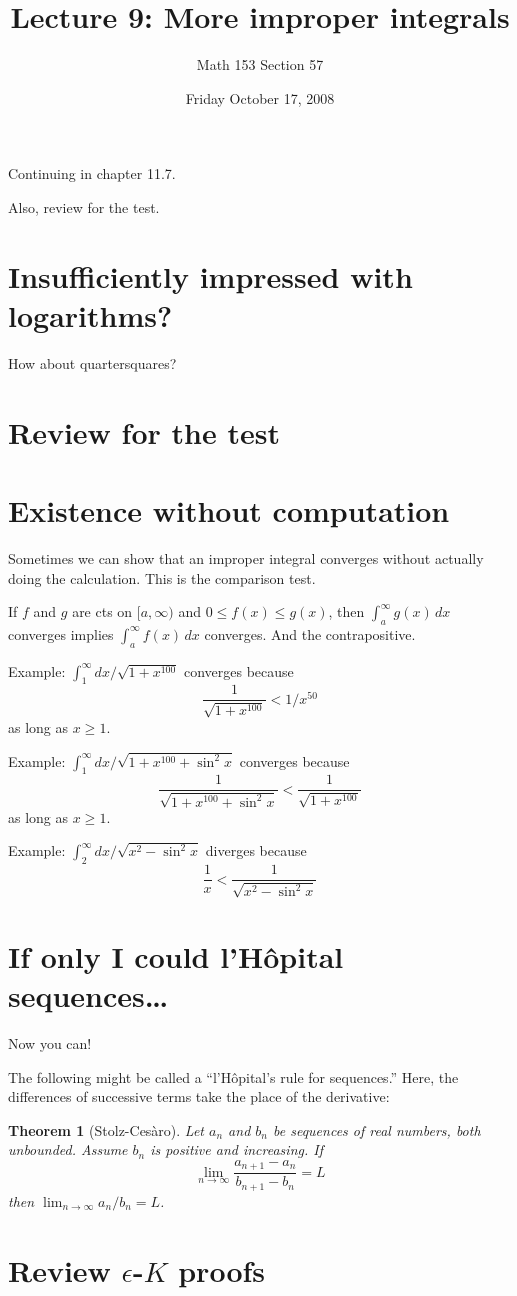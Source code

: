 \documentclass[12pt]{article}
\title{Lecture 9: More improper integrals}
\author{Math 153 Section 57}
\date{Friday October 17, 2008}
\newtheorem*{thm}{Theorem}
\begin{document}
\maketitle

Continuing in chapter 11.7.

Also, review for the test.

\section{Insufficiently impressed with logarithms?}

How about quartersquares?

\section{Review for the test}

\section{Existence without computation}

Sometimes we can show that an improper integral converges without actually doing the calculation.  This is the comparison test.

If $f$ and $g$ are cts on $[a,\infty)$ and $0 \leq f(x) \leq g(x)$,
then $\int_a^\infty g(x) \, dx$ converges implies $\int_a^\infty f(x)
\, dx$ converges.  And the contrapositive.

Example: $\int_1^\infty dx/\sqrt{1+x^{100}}$ converges because
$$
\frac{1}{\sqrt{1 + x^{100}}} < 1/x^{50}
$$
as long as $x \geq 1$.

Example: $\int_1^\infty dx/\sqrt{1+x^{100} + \sin^2 x}$ converges because
$$
\frac{1}{\sqrt{1 + x^{100} + \sin^2 x}} < \frac{1}{\sqrt{1 + x^{100}}}
$$
as long as $x \geq 1$.

Example: $\int_2^\infty dx/\sqrt{x^2 - \sin^2 x}$ diverges because
$$
\frac{1}{x} < \frac{1}{\sqrt{x^2 - \sin^2 x}}
$$

\section{If only I could l'H\^opital sequences\ldots}

Now you can!

The following might be called a ``l'H\^opital's rule for sequences.''
Here, the differences of successive terms take the place of the
derivative:
\begin{thm}[Stolz-Ces\`aro]
  Let $a_n$ and $b_n$ be sequences of real numbers, both unbounded.
  Assume $b_n$ is positive and increasing.  If
$$
\lim_{n \to \infty} \frac{a_{n+1} - a_n}{b_{n+1} - b_n} = L
$$
then $\displaystyle\lim_{n\to\infty} a_n/b_n = L$.
\end{thm}

\section{Review $\epsilon$-$K$ proofs}
\end{document}
